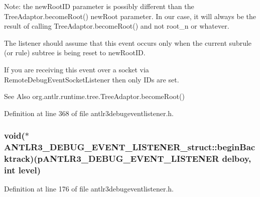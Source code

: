 Note\-: the new\-Root\-I\-D parameter is possibly different than the Tree\-Adaptor.\-become\-Root() new\-Root parameter. In our case, it will always be the result of calling Tree\-Adaptor.\-become\-Root() and not root\-\_\-n or whatever.

The listener should assume that this event occurs only when the current subrule (or rule) subtree is being reset to new\-Root\-I\-D.

If you are receiving this event over a socket via Remote\-Debug\-Event\-Socket\-Listener then only I\-Ds are set.

\begin{DoxySeeAlso}{See Also}
org.\-antlr.\-runtime.\-tree.\-Tree\-Adaptor.\-become\-Root() 
\end{DoxySeeAlso}


Definition at line 368 of file antlr3debugeventlistener.\-h.

\hypertarget{struct_a_n_t_l_r3___d_e_b_u_g___e_v_e_n_t___l_i_s_t_e_n_e_r__struct_a77996ab10c5e44e69c749153db018864}{
\subsubsection[{begin\-Backtrack}]{\setlength{\rightskip}{0pt plus 5cm}void($\ast$ A\-N\-T\-L\-R3\-\_\-\-D\-E\-B\-U\-G\-\_\-\-E\-V\-E\-N\-T\-\_\-\-L\-I\-S\-T\-E\-N\-E\-R\-\_\-struct\-::begin\-Backtrack)({\bf p\-A\-N\-T\-L\-R3\-\_\-\-D\-E\-B\-U\-G\-\_\-\-E\-V\-E\-N\-T\-\_\-\-L\-I\-S\-T\-E\-N\-E\-R} delboy, int {\bf level})}}\label{struct_a_n_t_l_r3___d_e_b_u_g___e_v_e_n_t___l_i_s_t_e_n_e_r__struct_a77996ab10c5e44e69c749153db018864}


Definition at line 176 of file antlr3debugeventlistener.\-h.

